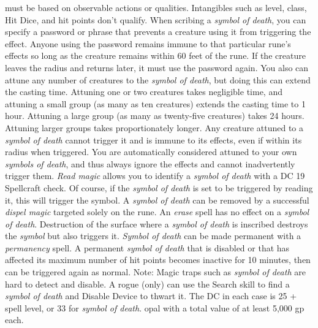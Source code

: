 must be based on observable actions or qualities. Intangibles such as level, class,
Hit Dice, and hit points don't qualify.
When scribing a \textit{symbol of death}, you can specify a password or phrase
that prevents a creature using it from triggering the effect. Anyone using
the password remains immune to that particular rune's effects so long as the creature
remains within 60 feet of the rune. If the creature leaves the radius and returns
later, it must use the password again.
You also can attune any number of creatures to the \textit{symbol of death}, but
doing this can extend the casting time. Attuning one or two creatures takes negligible
time, and attuning a small group (as many as ten creatures) extends the casting
time to 1 hour. Attuning a large group (as many as twenty-five creatures) takes
24 hours. Attuning larger groups takes proportionately longer. Any creature attuned
to a \textit{symbol of death} cannot trigger it and is immune to its effects, even
if within its radius when triggered. You are automatically considered attuned to
your own \textit{symbols of death}, and thus always ignore the effects and cannot
inadvertently trigger them.
\textit{Read magic} allows you to identify a \textit{symbol of death} with a DC
19 Spellcraft check. Of course, if the \textit{symbol of death} is set to be triggered
by reading it, this will trigger the symbol.
A \textit{symbol of death} can be removed by a successful \textit{dispel magic
}targeted solely on the rune. An \textit{erase} spell has no effect on a \textit{symbol
of death}. Destruction of the surface where a \textit{symbol of death} is inscribed
destroys the \textit{symbol} but also triggers it.
\textit{Symbol of death} can be made permanent with a \textit{permanency} spell.
A permanent \textit{symbol of death} that is disabled or that has affected its
maximum number of hit points becomes inactive for 10 minutes, then can be triggered
again as normal.
Note: Magic traps such as \textit{symbol of death} are hard to detect
and disable. A rogue (only) can use the Search skill to find a \textit{symbol of
death} and Disable Device to thwart it. The DC in each case is 25 + spell level,
or 33 for \textit{symbol of death}.
opal with a total value of at least 5,000 gp each.